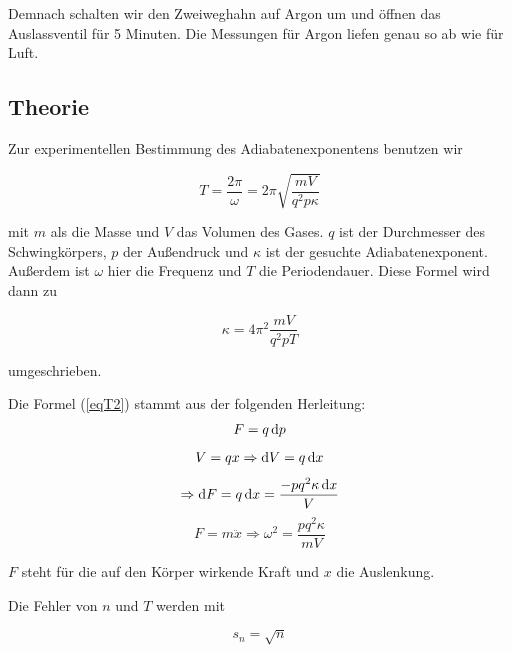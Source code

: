 \documentclass[11pt,a4paper]{article}
\newcommand\dif{\mathop{}\!\mathrm{d}}
\begin{document}
Demnach schalten wir den Zweiweghahn auf Argon um und öffnen das Auslassventil für 5 Minuten. Die Messungen für Argon liefen genau so ab wie für Luft. 

\subsection{Theorie}

Zur experimentellen Bestimmung des Adiabatenexponentens benutzen wir

\begin{equation}
T=\frac{2\pi}{\omega}=2\pi\sqrt{\frac{mV}{q^2p\kappa}}\label{eqT1}
\end{equation}

mit $m$ als die Masse und $V$ das Volumen des Gases. $q$ ist der Durchmesser des Schwingk\"orpers, $p$ der Au\ss endruck und $\kappa$ ist der gesuchte Adiabatenexponent. Au\ss erdem ist $\omega$ hier die Frequenz und $T$ die Periodendauer. Diese Formel wird dann zu

\begin{equation}
\kappa=4\pi^2\frac{mV}{q^2pT}\label{eqT2}
\end{equation}

umgeschrieben.

Die Formel (\ref{eqT2}) stammt aus der folgenden Herleitung:
$$F=q\dif p\\
$$
$$V=qx\Rightarrow \dif V=q\dif x\\
$$
$$\Rightarrow \dif F=q\dif x=\frac{-pq^2\kappa\dif x}{V}\\
$$
$$F=m\ddot{x}\Rightarrow \omega^2=\frac{pq^2\kappa}{mV}
$$

$F$ steht f\"ur die auf den K\"orper wirkende Kraft und $x$ die Auslenkung.

Die Fehler von $n$ und $T$ werden mit

\begin{equation}
s_n=\sqrt{n}\label{equn}
\end{equation}
\end{document}
